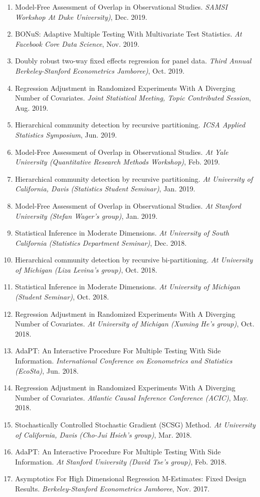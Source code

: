 \documentclass{article}
\begin{document}
\begin{enumerate}
\item Model-Free Assessment of Overlap in Observational Studies. \emph{SAMSI Workshop At Duke University)}, Dec. 2019.
\item BONuS: Adaptive Multiple Testing With Multivariate Test Statistics. \emph{At Facebook Core Data Science}, Nov. 2019.
\item Doubly robust two-way fixed effects regression for panel data. \emph{Third Annual Berkeley-Stanford Econometrics Jamboree)}, Oct. 2019.
\item Regression Adjustment in Randomized Experiments With A Diverging Number of Covariates. \emph{Joint Statistical Meeting, Topic Contributed Session}, Aug. 2019.
\item Hierarchical community detection by recursive partitioning. \emph{ICSA Applied Statistics Symposium}, Jun. 2019.
\item Model-Free Assessment of Overlap in Observational Studies. \emph{At Yale University (Quantitative Research Methods Workshop)}, Feb. 2019.
\item Hierarchical community detection by recursive partitioning. \emph{At University of California, Davis (Statistics Student Seminar)}, Jan. 2019.
\item Model-Free Assessment of Overlap in Observational Studies. \emph{At Stanford University (Stefan Wager's group)}, Jan. 2019.
\item Statistical Inference in Moderate Dimensions. \emph{At University of South California (Statistics Department Seminar)}, Dec. 2018.
\item Hierarchical community detection by recursive bi-partitioning. \emph{At University of Michigan (Liza Levina's group)}, Oct. 2018.
\item Statistical Inference in Moderate Dimensions. \emph{At University of Michigan (Student Seminar)}, Oct. 2018.
\item Regression Adjustment in Randomized Experiments With A Diverging Number of Covariates. \emph{At University of Michigan (Xuming He's group)}, Oct. 2018.
\item AdaPT: An Interactive Procedure For Multiple Testing With Side Information. \emph{International Conference on Econometrics and Statistics (EcoSta)}, Jun. 2018.
\item Regression Adjustment in Randomized Experiments With A Diverging Number of Covariates. \emph{Atlantic Causal Inference Conference (ACIC)}, May. 2018.
\item Stochastically Controlled Stochastic Gradient (SCSG) Method. \emph{At University of California, Davis (Cho-Jui Hsieh's group)}, Mar. 2018.
\item AdaPT: An Interactive Procedure For Multiple Testing With Side Information. \emph{At Stanford University (David Tse's group)}, Feb. 2018.
\item Asymptotics For High Dimensional Regression M-Estimates: Fixed Design Results. \emph{Berkeley-Stanford Econometrics Jamboree}, Nov. 2017. 
\end{enumerate}
 
\end{document}
